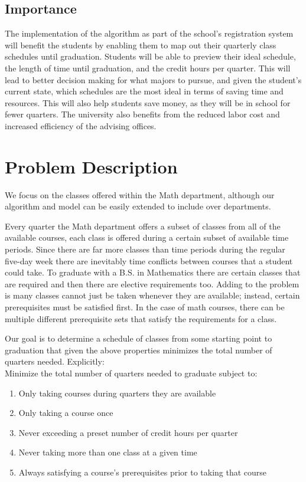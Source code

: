 \documentclass[11pt]{article} %
\begin{document}
\subsection{Importance} The implementation of the algorithm as part of the
school’s registration system will benefit the students by enabling them to map
out their quarterly class schedules until graduation. Students will be able to
preview their ideal schedule, the length of time until graduation, and the
credit hours per quarter.  This will lead to better decision making for what
majors to pursue, and given the student's current state, which schedules are the
most ideal in terms of saving time and resources. This will also help students
save money, as they will be in school for fewer quarters. The university also
benefits from the reduced labor cost and increased efficiency of the advising
offices.

\section{Problem Description} We focus on the classes offered within the Math
department, although our algorithm and model can be easily extended to include
over departments. 

Every quarter the Math department offers a subset of classes from all of the
available courses, each class is offered during a certain subset of available
time periods. Since there are far more classes than time periods during the
regular five-day week there are inevitably time conflicts between courses that
a student could take. To graduate with a B.S. in Mathematics there are certain
classes that are required and then there are elective requirements too. Adding
to the problem is many classes cannot just be taken whenever they are available;
instead, certain prerequisites must be satisfied first. In the case of math
courses, there can be multiple different prerequisite sets that satisfy the
requirements for a class.

Our goal is to determine a schedule of classes from some starting point to
graduation that given the above properties minimizes the total number of
quarters needed. Explicitly: \\ Minimize the total
number of quarters needed to graduate subject to: \begin{enumerate} \item Only
taking courses during quarters they are available \item Only taking a course
once \item Never exceeding a preset number of credit hours per quarter \item
Never taking more than one class at a given time \item Always satisfying
a course's prerequisites prior to taking that course \end{enumerate}
\end{document}
